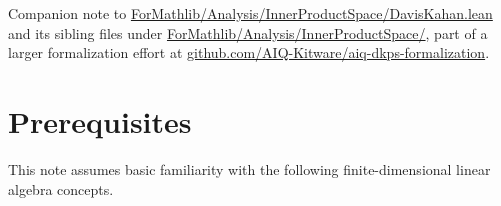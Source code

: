\documentclass[11pt]{article}
\theoremstyle{remark}
\begin{document}
\vspace{1.5em}
\noindent Companion note to \href{https://github.com/AIQ-Kitware/aiq-dkps-formalization/blob/ec453246c0b202f8ad9d2036080c5cc8fe009a09/ForMathlib/Analysis/InnerProductSpace/DavisKahan.lean}{ForMathlib/Analysis/InnerProductSpace/DavisKahan.lean} and its sibling files under \href{https://github.com/AIQ-Kitware/aiq-dkps-formalization/tree/ec453246c0b202f8ad9d2036080c5cc8fe009a09/ForMathlib/Analysis/InnerProductSpace}{ForMathlib/Analysis/InnerProductSpace/}, part of a larger formalization effort at \href{https://github.com/AIQ-Kitware/aiq-dkps-formalization}{github.com/AIQ-Kitware/aiq-dkps-formalization}.



\section{Prerequisites}

This note assumes basic familiarity with the following finite-dimensional linear
algebra concepts.
\end{document}
